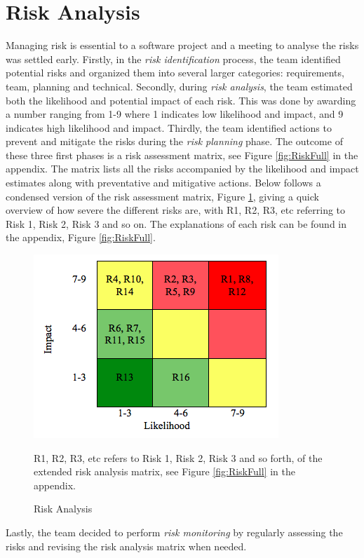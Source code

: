 \section{Risk Analysis}
Managing risk is essential to a software project and a meeting to analyse the risks was settled early. Firstly, in the \textit{risk identification} process, the team identified potential risks and organized them into several larger categories: requirements, team, planning and technical. Secondly, during \textit{risk analysis}, the team estimated both the likelihood and potential impact of each risk. This was done by awarding a number ranging from 1-9 where 1 indicates low likelihood and impact, and 9 indicates high likelihood and impact. Thirdly, the team identified actions to prevent and mitigate the risks during the \textit{risk planning} phase. The outcome of these three first phases is a risk assessment matrix, see Figure \ref{fig:RiskFull} in the appendix. The matrix lists all the risks accompanied by the likelihood and impact estimates along with preventative and mitigative actions. Below follows a condensed version of the risk assessment matrix, Figure \ref{fig:Risk}, giving a quick overview of how severe the different risks are, with R1, R2, R3, etc referring to Risk 1, Risk 2, Risk 3 and so on. The explanations of each risk can be found in the appendix, Figure \ref{fig:RiskFull}.
\begin{figure}[h!]
\centering
\includegraphics[scale=0.8]{Figures/RiskAnalysis.png}
\caption{Risk Analysis}
\label{fig:Risk}
\medskip
\small
R1, R2, R3, etc refers to Risk 1, Risk 2, Risk 3 and so forth, of the extended risk analysis matrix, see Figure \ref{fig:RiskFull} in the appendix.
\end{figure}

Lastly,  the team decided to perform \textit{risk monitoring} by regularly assessing the risks and revising the risk analysis matrix when needed. 


